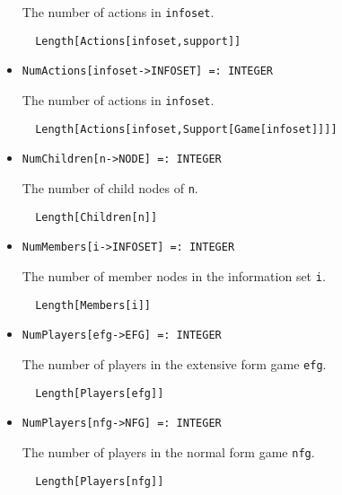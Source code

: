 \begin{itemize}
\bd 
The number of actions in \verb+infoset+.
\begin{verbatim}
  Length[Actions[infoset,support]] 
\end{verbatim} 
\ed

\item{}
\protect \large \begin{verbatim}
NumActions[infoset->INFOSET] =: INTEGER 
\end{verbatim}\normalsize

\bd 
The number of actions in  \verb+infoset+.
\begin{verbatim}
  Length[Actions[infoset,Support[Game[infoset]]]] 
\end{verbatim} 
\ed

\item{}
\protect \large \begin{verbatim}
NumChildren[n->NODE] =: INTEGER 
\end{verbatim}\normalsize

\bd 
The number of child nodes of \verb+n+.
\begin{verbatim}
  Length[Children[n]]
\end{verbatim} 
\ed

\item{}
\protect \large \begin{verbatim}
NumMembers[i->INFOSET] =: INTEGER 
\end{verbatim}\normalsize

\bd 
The number of member nodes in the information set \verb+i+.
\begin{verbatim}
  Length[Members[i]]
\end{verbatim} 
\ed

\item{}
\protect \large \begin{verbatim}
NumPlayers[efg->EFG] =: INTEGER 
\end{verbatim}\normalsize

\bd 
The number of players in the extensive form game \verb+efg+.
\begin{verbatim}
  Length[Players[efg]]
\end{verbatim} 
\ed

\item{}
\protect \large \begin{verbatim}
NumPlayers[nfg->NFG] =: INTEGER 
\end{verbatim}\normalsize

\bd 
The number of players in the normal form game \verb+nfg+.
\begin{verbatim}
  Length[Players[nfg]]
\end{verbatim} 
\ed


\end{itemize}
